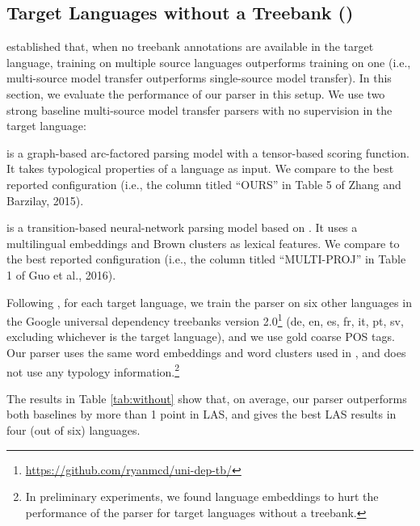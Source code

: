 \documentclass[11pt]{article}
\newenvironment{itemizesquish}{\begin{list}{\labelitemi}{\setlength{\itemsep}{0em}\setlength{\labelwidth}{0.5em}\setlength{\leftmargin}{\labelwidth}\addtolength{\leftmargin}{\labelsep}}}{\end{list}}
\begin{document}
\subsection{Target Languages without a Treebank ()}

 established that, when no treebank annotations are available in the target language, training on multiple source languages outperforms training on one (i.e., multi-source model transfer outperforms single-source model transfer).
In this section, we evaluate the performance of our parser in this setup.
We use two strong baseline multi-source model transfer parsers with no supervision in the target language:
\begin{itemizesquish}
\item {} is a graph-based arc-factored parsing model with a tensor-based scoring function. It takes typological properties of a language as input.
We compare to the best reported configuration (i.e., the column titled ``OURS'' in Table 5 of Zhang and Barzilay, 2015).
\item {} is a transition-based neural-network parsing model based on . It uses a multilingual embeddings and Brown clusters as lexical features.
We compare to the best reported configuration (i.e., the column titled ``MULTI-PROJ'' in Table 1 of Guo et al., 2016).
\end{itemizesquish}
Following , for each target language, we train the parser on six other languages in the Google universal dependency treebanks version 2.0\footnote{\url{https://github.com/ryanmcd/uni-dep-tb/}} (de, en, es, fr, it, pt, sv, excluding whichever is the target language), and we use gold coarse POS tags.
Our parser uses the same word embeddings and word clusters used in , and does not use any typology information.\footnote{In preliminary experiments, we found language embeddings to hurt the performance of the parser for target languages without a treebank.}

The results in Table \ref{tab:without} show that, on average, our parser outperforms both baselines by more than 1 point in LAS, and gives the best LAS results in four (out of six) languages.
\end{document}
